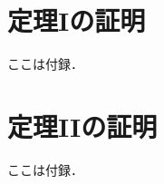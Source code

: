 \documentclass[../main/main]{subfiles}
\begin{document}
\appendix
\chapter{定理Iの証明}
ここは付録．

\chapter{定理IIの証明}
ここは付録．

\end{document}
